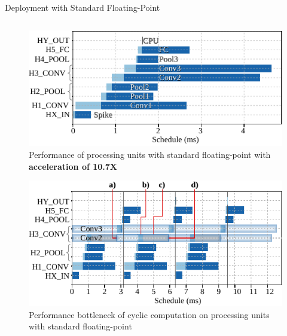 \begin{frame}{Deployment with Standard Floating-Point}
\begin{columns}
		\begin{column}{0.5\textwidth}
			\begin{minipage}[c][.45\textheight][c]{\linewidth}
				\centering
				\begin{figure}
					\includegraphics[width=0.75\linewidth]{../chapters/sbs_accelerator/figures/latency_pu_fp.pdf} %
					\caption{Performance of processing units with standard floating-point with \textbf{acceleration of 10.7X} }
				\end{figure}
				\pause
			\end{minipage}
			
			\begin{minipage}[c][.45\textheight][c]{\linewidth}
				\centering
				\begin{figure}
					\includegraphics[width=0.75\linewidth]{../chapters/sbs_accelerator/figures/latency_fp_cycle.pdf} %
					\caption{Performance bottleneck of cyclic computation on processing units with standard floating-point}
				\end{figure}
			\end{minipage}
		\end{column}
	\end{columns}
\end{frame}

